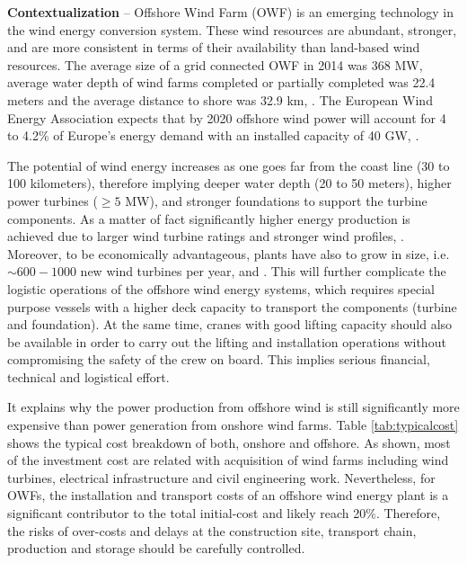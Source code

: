 \textbf{Contextualization} --
Offshore Wind Farm (OWF) is an emerging technology in the wind energy conversion system. These wind resources are abundant, stronger, and are more consistent in terms of their availability than land-based wind resources. The average size of a grid connected OWF in 2014 was 368 MW, average water depth of wind farms completed or partially completed was 22.4 meters and the average distance to shore was 32.9 km, \cite{Giorgio2015}. The European Wind Energy Association expects that by 2020 offshore wind power will account for 4 to 4.2\% of Europe's energy demand with an installed capacity of 40 GW,  \cite{EWEA2011, Kaldellis2013}.

The potential of wind energy increases as one goes far from the coast line (30 to 100 kilometers), therefore implying deeper water depth (20 to 50 meters), higher power turbines ($\geq 5$ MW), and stronger foundations to support the turbine components. As a matter of fact significantly higher energy production is achieved due to larger wind turbine ratings and stronger wind profiles, \cite{Sun2012298}. Moreover, to be economically advantageous, plants have also to grow in size, i.e. $\sim600-1000$ new wind turbines per year, \cite{EWEA2011} and \cite{Kaldellis2013}. This will further complicate the logistic operations of the offshore wind energy systems, which requires special purpose vessels with a higher deck capacity to transport the components (turbine and foundation). At the same time, cranes with good lifting capacity should also be available in order to carry out the lifting and installation operations without compromising the safety of the crew on board. This implies serious financial, technical and logistical effort.

It explains why the power production from offshore wind is still significantly more expensive than power generation from onshore wind farms. Table \ref{tab:typicalcost} shows the typical cost breakdown of both, onshore and offshore.%
As shown, most of the investment cost are related with acquisition of wind farms including wind turbines, electrical infrastructure and civil engineering work. Nevertheless, for OWFs, the installation and transport costs of an offshore wind energy plant is a significant contributor to the total initial-cost and likely reach 20\%. Therefore, the risks of over-costs and delays at the construction site, transport chain, production and storage should be carefully controlled.
